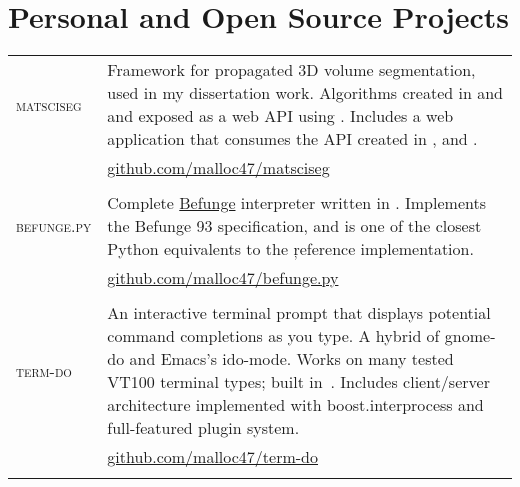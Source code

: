 \documentclass[10pt]{article}
\begin{document}
\newcommand{\proj}[3]{
  \textsc{#1} & #2\\
   &\href{http://www.#3}{#3}\\
   \multicolumn{2}{c}{} \\ [-1ex]
}

\newcommand{\projl}[3]{
  \textsc{#1} & #2\\
   &\href{http://www.#3}{#3}\\
}

\newcommand{\projlh}[4]{
  \textsc{#1} & #2\\
   &\href{#3}{#4}\\
}
\section{Personal and Open Source Projects}
\begin{tabularx}{\textwidth}{@{}p{3cm}|X@{}}

  \proj{matsciseg}%
  {Framework for propagated 3D volume segmentation, used in my
    dissertation work.  Algorithms created in \python and \cpp and
    exposed as a web API using \django. Includes a web application
    that consumes the API created in \js, and \jquery.}%
  {github.com/malloc47/matsciseg}


  \proj{befunge.py}{Complete \href{https://en.wikipedia.org/wiki/Befunge}{Befunge} interpreter written in \python.  Implements the Befunge 93 specification, and is one of the closest Python equivalents to the \c reference implementation.}{github.com/malloc47/befunge.py}

  \proj{term-do}{An interactive terminal prompt that displays potential command completions as you type.  A hybrid of gnome-do and Emacs's ido-mode.  Works on many tested VT100 terminal types; built in~\cpp.  Includes client/server architecture implemented with boost.interprocess and full-featured plugin system.
  }{github.com/malloc47/term-do}


\end{tabularx}
\end{document}
